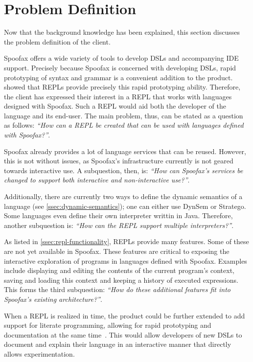 \section{Problem Definition}
\label{sec:problem-definition}

Now that the background knowledge has been explained, this section discusses the
problem definition of the client.

Spoofax offers a wide variety of tools to develop DSLs and accompanying IDE
support. Precisely because Spoofax is concerned with developing DSLs, rapid
prototyping of syntax and grammar is a convenient addition to the product.
 showed that REPLs provide precisely this rapid prototyping
ability.  Therefore, the client has expressed their interest in a REPL that
works with languages designed with Spoofax. Such a REPL would aid both the
developer of the language and its end-user. The main problem, thus, can be
stated as a question as follows: \textit{``How can a REPL be created that can be
used with languages defined with Spoofax?''}.

Spoofax already provides a lot of language services that can be reused. However,
this is not without issues, as Spoofax's infrastructure currently is not geared
towards interactive use. A subquestion, then, is: \textit{``How can Spoofax's
services be changed to support both interactive and non-interactive use?''}.

Additionally, there are currently two ways to define the dynamic semantics of a
language (see \cref{ssec:dynamic-semantics}); one can either use DynSem or Stratego.
Some languages even define their own interpreter writtin in Java. Therefore,
another subquestion is: \textit{``How can the REPL support multiple
interpreters?''}.

As listed in \cref{ssec:repl-functionality}, REPLs provide many features. Some
of these are not yet available in Spoofax. These features are critical to
exposing the interactive exploration of programs in languages defined with
Spoofax. Examples include displaying and editing the contents of the current
program's context, saving and loading this context and keeping a history of
executed expressions. This forms the third subquestion: \textit{``How do these
additional features fit into Spoofax's existing architecture?''}.

When a REPL is realized in time, the product could be further extended to add
support for literate programming, allowing for rapid prototyping and
documentation at the same time~\cite{schulte2012}. This would allow
developers of new DSLs to document and explain their language in an
interactive manner that directly allows experimentation.

